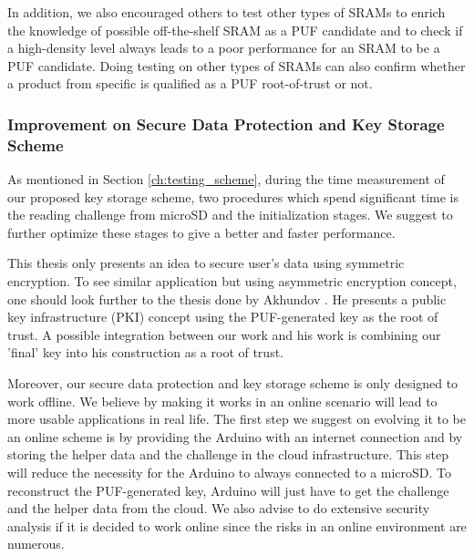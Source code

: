 In addition, we also encouraged others to test other types of SRAMs to enrich the knowledge of possible off-the-shelf SRAM as a PUF candidate and to check if a high-density level always leads to a poor performance for an SRAM to be a PUF candidate. Doing testing on other types of SRAMs can also confirm whether a product from specific is qualified as a PUF root-of-trust or not.

\subsubsection{Improvement on Secure Data Protection and Key Storage Scheme}
As mentioned in Section \ref{ch:testing_scheme}, during the time measurement of our proposed key storage scheme, two procedures which spend significant time is the reading challenge from microSD and the initialization stages. We suggest to further optimize these stages to give a better and faster performance.

This thesis only presents an idea to secure user's data using symmetric encryption. To see similar application but using asymmetric encryption concept, one should look further to the thesis done by Akhundov \cite{haji}. He presents a public key infrastructure (PKI) concept using the PUF-generated key as the root of trust. A possible integration between our work and his work is combining our 'final' key into his construction as a root of trust.

Moreover, our secure data protection and key storage scheme is only designed to work offline. We believe by making it works in an online scenario will lead to more usable applications in real life. The first step we suggest on evolving it to be an online scheme is by providing the Arduino with an internet connection and by storing the helper data and the challenge in the cloud infrastructure. This step will reduce the necessity for the Arduino to always connected to a microSD. To reconstruct the PUF-generated key, Arduino will just have to get the challenge and the helper data from the cloud. We also advise to do extensive security analysis if it is decided to work online since the risks in an online environment are numerous.

